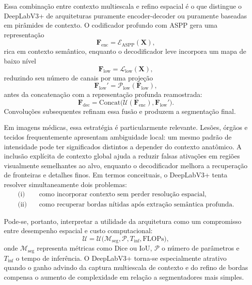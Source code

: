 \documentclass[tcc,capa]{texufpel}
\begin{document}
Essa combinação entre contexto multiescala e refino espacial é o que distingue o DeepLabV3+ de arquiteturas puramente encoder-decoder ou puramente baseadas em pirâmides de contexto. O codificador profundo com ASPP gera uma representação
\begin{equation}
	\mathbf{F}_{\text{enc}} = \mathcal{E}_{\text{ASPP}}(\mathbf{X}),
\end{equation}
rica em contexto semântico, enquanto o decodificador leve incorpora um mapa de baixo nível
\begin{equation}
	\mathbf{F}_{\text{low}} = \mathcal{L}_{\text{low}}(\mathbf{X}),
\end{equation}
reduzindo seu número de canais por uma projeção
\begin{equation}
	\mathbf{F}_{\text{low}}' = \mathcal{P}_{\text{low}}(\mathbf{F}_{\text{low}}),
\end{equation}
antes da concatenação com a representação profunda reamostrada:
\begin{equation}
	\mathbf{F}_{\text{dec}}
	=
	\mathrm{Concat}
	\big(
	\mathcal{U}(\mathbf{F}_{\text{enc}}),
	\mathbf{F}_{\text{low}}'
	\big).
\end{equation}
Convoluções subsequentes refinam essa fusão e produzem a segmentação final.

Em imagens médicas, essa estratégia é particularmente relevante. Lesões, órgãos e tecidos frequentemente apresentam ambiguidade local: um mesmo padrão de intensidade pode ter significados distintos a depender do contexto anatômico. A inclusão explícita de contexto global ajuda a reduzir falsas ativações em regiões visualmente semelhantes ao alvo, enquanto o decodificador melhora a recuperação de fronteiras e detalhes finos. Em termos conceituais, o DeepLabV3+ tenta resolver simultaneamente dois problemas:
\begin{align}
	\text{(i)} &\quad \text{como incorporar contexto sem perder resolução espacial,}\\
	\text{(ii)} &\quad \text{como recuperar bordas nítidas após extração semântica profunda.}
\end{align}

Pode-se, portanto, interpretar a utilidade da arquitetura como um compromisso entre desempenho espacial e custo computacional:
\begin{equation}
	\mathcal{U}
	=
	\mathcal{U}\big(
	\mathcal{M}_{\text{seg}},
	\mathcal{P},
	T_{\text{inf}},
	\text{FLOPs}
	\big),
\end{equation}
onde \(\mathcal{M}_{\text{seg}}\) representa métricas como Dice ou IoU, \(\mathcal{P}\) o número de parâmetros e \(T_{\text{inf}}\) o tempo de inferência. O DeepLabV3+ torna-se especialmente atrativo quando o ganho advindo da captura multiescala de contexto e do refino de bordas compensa o aumento de complexidade em relação a segmentadores mais simples.
\end{document}
